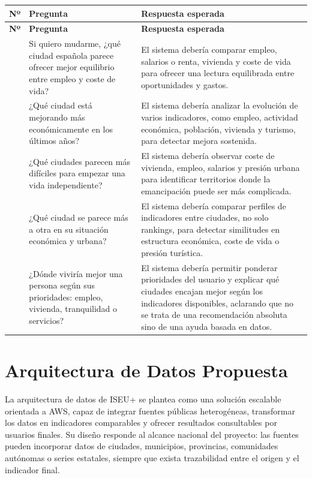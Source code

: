 \begin{longtable}{>{\raggedright\arraybackslash}p{} >{\raggedright\arraybackslash}p{} >{\raggedright\arraybackslash}p{}}
\toprule
\textbf{Nº} & \textbf{Pregunta} & \textbf{Respuesta esperada} \\
\midrule
\endfirsthead
\toprule
\textbf{Nº} & \textbf{Pregunta} & \textbf{Respuesta esperada} \\
\midrule
\endhead
26 & Si quiero mudarme, ¿qué ciudad española parece ofrecer mejor equilibrio entre empleo y coste de vida? & El sistema debería comparar empleo, salarios o renta, vivienda y coste de vida para ofrecer una lectura equilibrada entre oportunidades y gastos. \\
27 & ¿Qué ciudad está mejorando más económicamente en los últimos años? & El sistema debería analizar la evolución de varios indicadores, como empleo, actividad económica, población, vivienda y turismo, para detectar mejora sostenida. \\
28 & ¿Qué ciudades parecen más difíciles para empezar una vida independiente? & El sistema debería observar coste de vivienda, empleo, salarios y presión urbana para identificar territorios donde la emancipación puede ser más complicada. \\
29 & ¿Qué ciudad se parece más a otra en su situación económica y urbana? & El sistema debería comparar perfiles de indicadores entre ciudades, no solo rankings, para detectar similitudes en estructura económica, coste de vida o presión turística. \\
30 & ¿Dónde viviría mejor una persona según sus prioridades: empleo, vivienda, tranquilidad o servicios? & El sistema debería permitir ponderar prioridades del usuario y explicar qué ciudades encajan mejor según los indicadores disponibles, aclarando que no se trata de una recomendación absoluta sino de una ayuda basada en datos. \\
\bottomrule
\end{longtable}

\chapter{Arquitectura de Datos Propuesta}

La arquitectura de datos de ISEU+ se plantea como una solución escalable orientada a AWS, capaz de integrar fuentes públicas heterogéneas, transformar los datos en indicadores comparables y ofrecer resultados consultables por usuarios finales. Su diseño responde al alcance nacional del proyecto: las fuentes pueden incorporar datos de ciudades, municipios, provincias, comunidades autónomas o series estatales, siempre que exista trazabilidad entre el origen y el indicador final.

